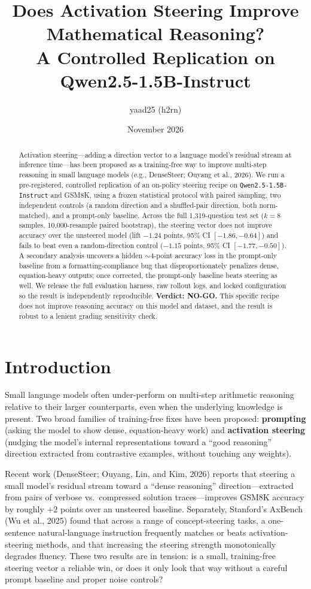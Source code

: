 \documentclass[11pt]{article}
\title{Does Activation Steering Improve Mathematical Reasoning?\\
A Controlled Replication on Qwen2.5-1.5B-Instruct}
\author{yaad25 (h2rn)}
\date{November 2026}
\begin{document}
\maketitle

\begin{abstract}
Activation steering---adding a direction vector to a language model's residual stream at
inference time---has been proposed as a training-free way to improve multi-step reasoning in
small language models (e.g., DenseSteer; Ouyang et al., 2026). We run a pre-registered,
controlled replication of an on-policy steering recipe on \texttt{Qwen2.5-1.5B-Instruct} and
GSM8K, using a frozen statistical protocol with paired sampling, two independent controls (a
random direction and a shuffled-pair direction, both norm-matched), and a prompt-only baseline.
Across the full 1{,}319-question test set ($k=8$ samples, 10{,}000-resample paired bootstrap),
the steering vector does not improve accuracy over the unsteered model (lift $-1.24$ points, 95\%
CI $[-1.86, -0.64]$) and fails to beat even a random-direction control ($-1.15$ points, 95\% CI
$[-1.77, -0.50]$). A secondary analysis uncovers a hidden $\sim\!4$-point accuracy loss in the
prompt-only baseline from a formatting-compliance bug that disproportionately penalizes dense,
equation-heavy outputs; once corrected, the prompt-only baseline beats steering as well. We
release the full evaluation harness, raw rollout logs, and locked configuration so the result is
independently reproducible. \textbf{Verdict: NO-GO.} This specific recipe does not improve
reasoning accuracy on this model and dataset, and the result is robust to a lenient grading
sensitivity check.
\end{abstract}

\section{Introduction}

Small language models often under-perform on multi-step arithmetic reasoning relative to their
larger counterparts, even when the underlying knowledge is present. Two broad families of
training-free fixes have been proposed: \textbf{prompting} (asking the model to show dense,
equation-heavy work) and \textbf{activation steering} (nudging the model's internal
representations toward a ``good reasoning'' direction extracted from contrastive examples,
without touching any weights).

Recent work (DenseSteer; Ouyang, Lin, and Kim, 2026) reports that steering a small model's
residual stream toward a ``dense reasoning'' direction---extracted from pairs of verbose vs.\
compressed solution traces---improves GSM8K accuracy by roughly $+2$ points over an unsteered
baseline. Separately, Stanford's AxBench (Wu et al., 2025) found that across a range of
concept-steering tasks, a one-sentence natural-language instruction frequently matches or beats
activation-steering methods, and that increasing the steering strength monotonically degrades
fluency. These two results are in tension: is a small, training-free steering vector a reliable
win, or does it only look that way without a careful prompt baseline and proper noise controls?
\end{document}
